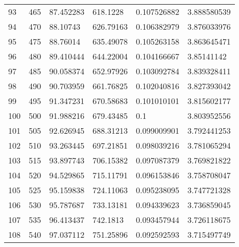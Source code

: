 \documentclass[../Matt_Gebert_Honours_Thesis.tex]{subfiles}
\begin{document}
\begin{longtable}[c]{l|lllll}
	93  & 465                     & 87.452283               & 618.1228  & 0.107526882             & 3.888580539            \\
	94  & 470                     & 88.10743                & 626.79163 & 0.106382979             & 3.876033976            \\
	95  & 475                     & 88.76014                & 635.49078 & 0.105263158             & 3.863645471            \\
	96  & 480                     & 89.410444               & 644.22004 & 0.104166667             & 3.85141142             \\
	97  & 485                     & 90.058374               & 652.97926 & 0.103092784             & 3.839328411            \\
	98  & 490                     & 90.703959               & 661.76825 & 0.102040816             & 3.827393042            \\
	99  & 495                     & 91.347231               & 670.58683 & 0.101010101             & 3.815602177            \\
	100 & 500                     & 91.988216               & 679.43485 & 0.1                     & 3.803952556            \\
	101 & 505                     & 92.626945               & 688.31213 & 0.099009901             & 3.792441253            \\
	102 & 510                     & 93.263445               & 697.21851 & 0.098039216             & 3.781065294            \\
	103 & 515                     & 93.897743               & 706.15382 & 0.097087379             & 3.769821822            \\
	104 & 520                     & 94.529865               & 715.11791 & 0.096153846             & 3.758708047            \\
	105 & 525                     & 95.159838               & 724.11063 & 0.095238095             & 3.747721328            \\
	106 & 530                     & 95.787687               & 733.13181 & 0.094339623             & 3.736859045            \\
	107 & 535                     & 96.413437               & 742.1813  & 0.093457944             & 3.726118675            \\
	108 & 540                     & 97.037112               & 751.25896 & 0.092592593             & 3.715497749            \\

\end{longtable}
\end{document}
